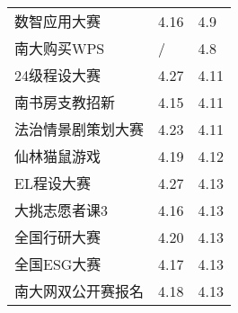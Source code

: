 \documentclass[letterpaper, 12pt]{article}
\begin{document}
\begin{multicols}{2}
{\begin{longtable}{|>{\centering\arraybackslash}m{}|m{}|m{}|}
    数智应用大赛 & 4.16 & 4.9\\
    南大购买WPS & / & 4.8\\
    24级程设大赛 & 4.27 & 4.11\\
    南书房支教招新 & 4.15 & 4.11\\
    法治情景剧策划大赛 & 4.23 & 4.11\\
    仙林猫鼠游戏 & 4.19 & 4.12\\
    EL程设大赛 & 4.27 & 4.13\\
    大挑志愿者课3 & 4.16 & 4.13\\
    全国行研大赛 & 4.20 & 4.13\\
    全国ESG大赛 & 4.17 & 4.13\\
    南大网双公开赛报名 & 4.18 & 4.13\\
    
    \hline
\end{longtable}
\unskip
\unpenalty
\unpenalty}\unvbox\colbbox
\end{multicols}
\end{document}

